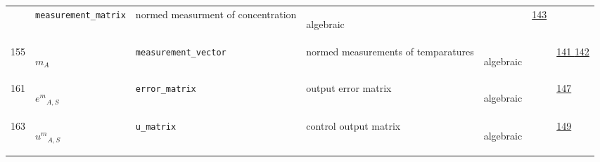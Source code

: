 \begin{longtable}{|p{1cm}|p{2.5cm}|p{4.5cm}|p{8cm}|p{3.0cm}|p{3cm}|p{1cm}|}
             & \verb|measurement_matrix|
             & normed measurment of concentration
             & \begin{lay}algebraic \end{lay}
             & $  $
             &                 \hyperlink{"e:143"}{ 143 }
                 \\
            155
             & \hypertarget{"v:155"}{ $ {m}{_{A}} $}
             & \verb|measurement_vector|
             & normed measurements of temparatures
             & \begin{lay}algebraic \end{lay}
             & $  $
             &                 \hyperlink{"e:141"}{ 141 }
                                 \hyperlink{"e:142"}{ 142 }
                 \\
            161
             & \hypertarget{"v:161"}{ $ {{e^{m}}}{_{A, S}} $}
             & \verb|error_matrix|
             & output error matrix
             & \begin{lay}algebraic \end{lay}
             & $  $
             &                 \hyperlink{"e:147"}{ 147 }
                 \\
            163
             & \hypertarget{"v:163"}{ $ {{u^{m}}}{_{A, S}} $}
             & \verb|u_matrix|
             & control output matrix
             & \begin{lay}algebraic \end{lay}
             & $  $
             &                 \hyperlink{"e:149"}{ 149 }
                 \\
    \end{longtable}